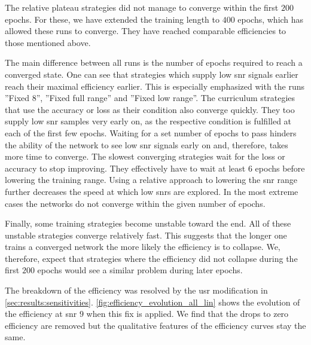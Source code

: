The relative plateau strategies did not manage to converge within the first $200$ epochs. For these, we have extended the training length to $400$ epochs, which has allowed these runs to converge. They have reached comparable efficiencies to those mentioned above.

The main difference between all runs is the number of epochs required to reach a converged state. One can see that strategies which supply low \acrshort{snr} signals earlier reach their maximal efficiency earlier. This is especially emphasized with the runs ''Fixed 8'', ''Fixed full range'' and ''Fixed low range''. The curriculum strategies that use the accuracy or loss as their condition also converge quickly. They too supply low \acrshort{snr} samples very early on, as the respective condition is fulfilled at each of the first few epochs. Waiting for a set number of epochs to pass hinders the ability of the network to see low \acrshort{snr} signals early on and, therefore, takes more time to converge. The slowest converging strategies wait for the loss or accuracy to stop improving. They effectively have to wait at least $6$ epochs before lowering the training range. Using a relative approach to lowering the \acrshort{snr} range further decreases the speed at which low \acrshort{snr}s are explored. In the most extreme cases the networks do not converge within the given number of epochs.

Finally, some training strategies become unstable toward the end. All of these unstable strategies converge relatively fast. This suggests that the longer one trains a converged network the more likely the efficiency is to collapse. We, therefore, expect that strategies where the efficiency did not collapse during the first $200$ epochs would see a similar problem during later epochs.

The breakdown of the efficiency was resolved by the \acrshort{usr} modification in \autoref{sec:results:sensitivities}. \autoref{fig:efficiency_evolution_all_lin} shows the evolution of the efficiency at \acrshort{snr} $9$ when this fix is applied. We find that the drops to zero efficiency are removed but the qualitative features of the efficiency curves stay the same.


